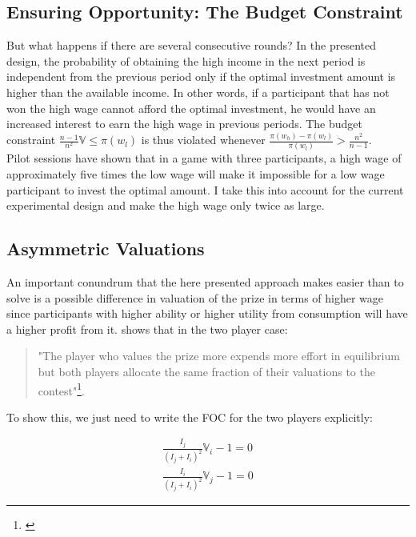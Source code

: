 \subsection{Ensuring Opportunity: The Budget Constraint}
\label{sec:budget_constraint}

But what happens if there are several consecutive rounds? In the presented design, the probability of obtaining the high income in the next period is independent from the previous period only if the optimal investment amount is higher than the available income. In other words, if a participant that has not won the high wage cannot afford the optimal investment, he would have an increased interest to earn the high wage in previous periods. The budget constraint $\frac{n-1}{n^2}\mathbb{V} \leq \pi(w_l)$ is thus violated whenever $\frac{\pi(w_h)-\pi(w_l)}{\pi(w_l)} > \frac{n^2}{n-1}$.\\

Pilot sessions have shown that in a game with three participants, a high wage of approximately five times the low wage will make it impossible for a low wage participant to invest the optimal amount. I take this into account for the current experimental design and make the high wage only twice as large.

\subsection{Asymmetric Valuations}

An important conundrum that the here presented approach makes easier than \cite{koch2017} to solve is a possible difference in valuation of the prize in terms of higher wage since participants with higher ability or higher utility from consumption will have a higher profit from it. \cite{nti1999} shows that in the two player case:\\

\begin{quote}
    "The player who values the prize more expends more effort in equilibrium but both players allocate the same fraction of their valuations to the contest"\footnote{\cite[p.~419]{nti1999}}.
\end{quote}

To show this, we just need to write the FOC for the two players explicitly:

\begin{equation*}
\begin{split}
    \frac{I_j}{(I_j + I_i)^2}\mathbb{V}_i-1 = 0 \\
    \frac{I_i}{(I_j + I_i)^2}\mathbb{V}_j-1 = 0
\end{split}
\end{equation*}

